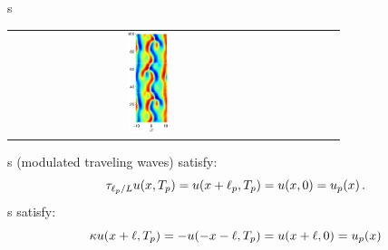 \documentclass{beamer}
\begin{document}
\begin{frame}{\Rpo s}
\begin{tabular}{ccccc}
\includegraphics[width=0.15\textwidth]{../../figs/ks22rpo066.8-00.00.eps}\\
\end{tabular}
\Rpo s (modulated traveling waves) satisfy:
\[
  \tau_{\ell_p/L}u(x,{T_{p}}) =
  u(x+\ell_p,{T_{p}}) = u(x,0) = u_p(x)\,.
\]
\Po s satisfy:
\[
   \kappa u(x+\ell,{T_{p}}) =
  -u(-x-\ell,{T_{p}}) = u(x+\ell,0) = u_p(x)
\]
\end{frame}
\end{document}
